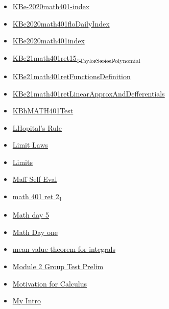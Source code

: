 \documentclass[11pt]{article}
\begin{document}
\begin{itemize}
\begin{itemize}
\begin{itemize}
\item \href{mathematics/single\_variable\_calculus/KBe-2020math401-index.org}{KBe-2020math401-index}
\item \href{mathematics/single\_variable\_calculus/KBe2020math401floDailyIndex.org}{KBe2020math401floDailyIndex}
\item \href{mathematics/single\_variable\_calculus/KBe2020math401index.org}{KBe2020math401index}
\item \href{mathematics/single\_variable\_calculus/KBe21math401ret15\_1TaylorSeriesPolynomial.org}{KBe21math401ret15\textsubscript{1TaylorSeriesPolynomial}}
\item \href{mathematics/single\_variable\_calculus/KBe21math401retFunctionsDefinition.org}{KBe21math401retFunctionsDefinition}
\item \href{mathematics/single\_variable\_calculus/KBe21math401retLinearApproxAndDefferentials.org}{KBe21math401retLinearApproxAndDefferentials}
\item \href{mathematics/single\_variable\_calculus/KBhMATH401Test.org}{KBhMATH401Test}
\item \href{mathematics/single\_variable\_calculus/eRefLHopitalRule.org}{LHopital's Rule}
\item \href{mathematics/single\_variable\_calculus/KBhMATH401LimitLaws.org}{Limit Laws}
\item \href{mathematics/single\_variable\_calculus/KBhMATH401Limits.org}{Limits}
\item \href{mathematics/single\_variable\_calculus/KBxMaffSSelfEval.org}{Maff Self Eval}
\item \href{mathematics/single\_variable\_calculus/KBe20math401ret2\_1.org}{math 401 ret 2\textsubscript{1}}
\item \href{mathematics/single\_variable\_calculus/KBe20math401flo5.org}{Math day 5}
\item \href{mathematics/single\_variable\_calculus/KB20200824094500.org}{Math Day one}
\item \href{mathematics/single\_variable\_calculus/KBrefMeanValueTheoremForIntegrals.org}{mean value theorem for integrals}
\item \href{mathematics/single\_variable\_calculus/KBe20math401retModule2GroupTestPrelim.org}{Module 2 Group Test Prelim}
\item \href{mathematics/single\_variable\_calculus/KBe2020math401floCalcMotivation.org}{Motivation for Calculus}
\item \href{mathematics/single\_variable\_calculus/KBe2020math401ret0MyIntro.org}{My Intro}

\end{itemize}
\end{itemize}
\end{itemize}
\end{document}
